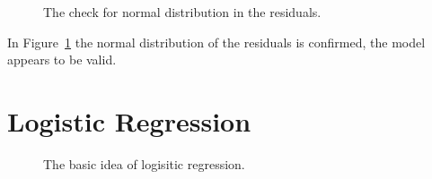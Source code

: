 \documentclass[
  a4paper,
]{scrbook}
\begin{document}
\begin{figure}[H]


\caption{\label{fig-mlm-resid-nd}The check for normal distribution in
the residuals.}

\end{figure}%

In Figure~\ref{fig-mlm-resid-nd} the normal distribution of the
residuals is confirmed, the model appears to be valid.

\newpage{}

\section{Logistic Regression}\label{logistic-regression}

\begin{figure}[H]


\caption{\label{fig-logreg-basic}The basic idea of logisitic
regression.}

\end{figure}%
\end{document}
